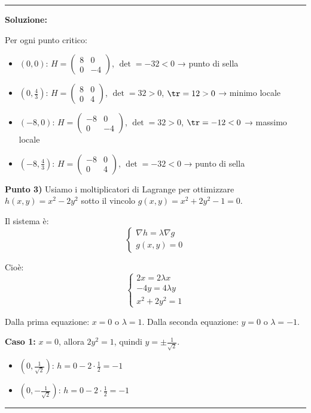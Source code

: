 \documentclass[12pt, a4paper]{article}
\newenvironment{solution}
{\par\noindent\rule{\textwidth}{0.4pt}\par\textbf{Soluzione:}\medskip\par}
{\par\rule{\textwidth}{0.4pt}\par\bigskip}
\begin{document}
\begin{solution}
Per ogni punto critico:
\begin{itemize}
    \item $(0,0)$: $H = \begin{pmatrix} 8 & 0 \\ 0 & -4 \end{pmatrix}$, $\det = -32 < 0$ → punto di sella
    \item $(0,\frac{4}{3})$: $H = \begin{pmatrix} 8 & 0 \\ 0 & 4 \end{pmatrix}$, $\det = 32 > 0$, $\tr = 12 > 0$ → minimo locale
    \item $(-8,0)$: $H = \begin{pmatrix} -8 & 0 \\ 0 & -4 \end{pmatrix}$, $\det = 32 > 0$, $\tr = -12 < 0$ → massimo locale
    \item $(-8,\frac{4}{3})$: $H = \begin{pmatrix} -8 & 0 \\ 0 & 4 \end{pmatrix}$, $\det = -32 < 0$ → punto di sella
\end{itemize}

\vspace{0.5cm}

\textbf{Punto 3)} Usiamo i moltiplicatori di Lagrange per ottimizzare $h(x,y) = x^2 - 2y^2$ sotto il vincolo $g(x,y) = x^2 + 2y^2 - 1 = 0$.

Il sistema è:
\[
\begin{cases}
\nabla h = \lambda \nabla g \\
g(x,y) = 0
\end{cases}
\]

Cioè:
\[
\begin{cases}
2x = 2\lambda x \\
-4y = 4\lambda y \\
x^2 + 2y^2 = 1
\end{cases}
\]

Dalla prima equazione: $x = 0$ o $\lambda = 1$.
Dalla seconda equazione: $y = 0$ o $\lambda = -1$.

\textbf{Caso 1:} $x = 0$, allora $2y^2 = 1$, quindi $y = \pm\frac{1}{\sqrt{2}}$.
\begin{itemize}
    \item $(0, \frac{1}{\sqrt{2}})$: $h = 0 - 2 \cdot \frac{1}{2} = -1$
    \item $(0, -\frac{1}{\sqrt{2}})$: $h = 0 - 2 \cdot \frac{1}{2} = -1$
\end{itemize}


\end{solution}
\end{document}
